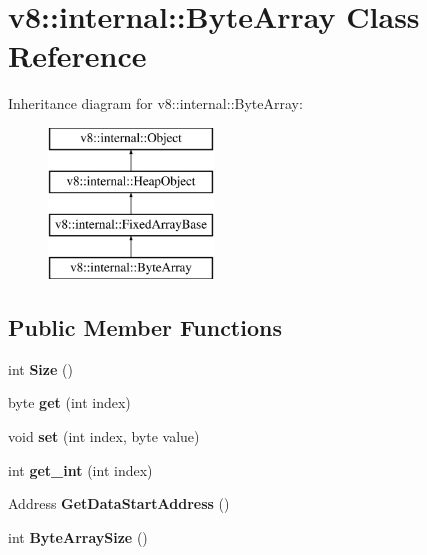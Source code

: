 \hypertarget{classv8_1_1internal_1_1_byte_array}{}\section{v8\+:\+:internal\+:\+:Byte\+Array Class Reference}
\label{classv8_1_1internal_1_1_byte_array}
Inheritance diagram for v8\+:\+:internal\+:\+:Byte\+Array\+:\begin{figure}[H]
\begin{center}
\leavevmode
\includegraphics[height=4.000000cm]{classv8_1_1internal_1_1_byte_array}
\end{center}
\end{figure}
\subsection*{Public Member Functions}
\begin{DoxyCompactItemize}
\item 
\hypertarget{classv8_1_1internal_1_1_byte_array_a738020faf50daf7fb95d4d0ef9fc8731}{}int {\bfseries Size} ()\label{classv8_1_1internal_1_1_byte_array_a738020faf50daf7fb95d4d0ef9fc8731}

\item 
\hypertarget{classv8_1_1internal_1_1_byte_array_aef7f1d8ba217aaa3c4b4e690928f8d4f}{}byte {\bfseries get} (int index)\label{classv8_1_1internal_1_1_byte_array_aef7f1d8ba217aaa3c4b4e690928f8d4f}

\item 
\hypertarget{classv8_1_1internal_1_1_byte_array_ad008d43b0348efd99a740d495808ad6c}{}void {\bfseries set} (int index, byte value)\label{classv8_1_1internal_1_1_byte_array_ad008d43b0348efd99a740d495808ad6c}

\item 
\hypertarget{classv8_1_1internal_1_1_byte_array_a451a1d97de1b1dbba8a8dd238d28d0dd}{}int {\bfseries get\+\_\+int} (int index)\label{classv8_1_1internal_1_1_byte_array_a451a1d97de1b1dbba8a8dd238d28d0dd}

\item 
\hypertarget{classv8_1_1internal_1_1_byte_array_adff402fb5d35ec6b54583c9cad16c462}{}Address {\bfseries Get\+Data\+Start\+Address} ()\label{classv8_1_1internal_1_1_byte_array_adff402fb5d35ec6b54583c9cad16c462}

\item 
\hypertarget{classv8_1_1internal_1_1_byte_array_a64c9a5f6345c629889a3ddc101514e2a}{}int {\bfseries Byte\+Array\+Size} ()\label{classv8_1_1internal_1_1_byte_array_a64c9a5f6345c629889a3ddc101514e2a}

\end{DoxyCompactItemize}
